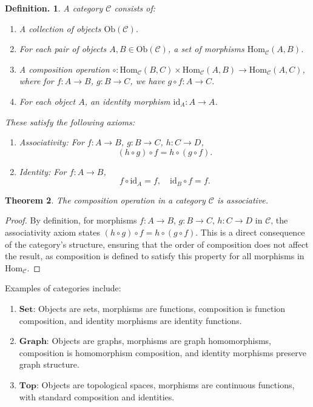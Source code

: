 \documentclass{amsart}
\newtheorem{thm}{Theorem}
\newtheorem{defn}[thm]{Definition.}
\begin{document}
\begin{defn}
A \emph{category} \( \mathcal{C} \) consists of:
\begin{enumerate}
    \item A collection of \emph{objects} \( \text{Ob}(\mathcal{C}) \).
    \item For each pair of objects \( A, B \in \text{Ob}(\mathcal{C}) \), a set of \emph{morphisms} \( \text{Hom}_{\mathcal{C}}(A, B) \).
    \item A \emph{composition} operation \( \circ: \text{Hom}_{\mathcal{C}}(B, C) \times \text{Hom}_{\mathcal{C}}(A, B) \to \text{Hom}_{\mathcal{C}}(A, C) \), where for \( f: A \to B \), \( g: B \to C \), we have \( g \circ f: A \to C \).
    \item For each object \( A \), an \emph{identity morphism} \( \text{id}_A: A \to A \).
\end{enumerate}
These satisfy the following axioms:
\begin{enumerate}
    \item \emph{Associativity}: For \( f: A \to B \), \( g: B \to C \), \( h: C \to D \), 
    \[
    (h \circ g) \circ f = h \circ (g \circ f).
    \]
    \item \emph{Identity}: For \( f: A \to B \),
    \[
    f \circ \text{id}_A = f, \quad \text{id}_B \circ f = f.
    \]
\end{enumerate}
\end{defn}

\begin{thm}
The composition operation in a category \( \mathcal{C} \) is associative.
\end{thm}

\begin{proof}
By definition, for morphisms \( f: A \to B \), \( g: B \to C \), \( h: C \to D \) in \( \mathcal{C} \), the associativity axiom states \( (h \circ g) \circ f = h \circ (g \circ f) \). This is a direct consequence of the category’s structure, ensuring that the order of composition does not affect the result, as composition is defined to satisfy this property for all morphisms in \( \text{Hom}_{\mathcal{C}} \).
\end{proof}

Examples of categories include:
\begin{enumerate}
    \item \( \mathbf{Set} \): Objects are sets, morphisms are functions, composition is function composition, and identity morphisms are identity functions.
    \item \( \mathbf{Graph} \): Objects are graphs, morphisms are graph homomorphisms, composition is homomorphism composition, and identity morphisms preserve graph structure.
    \item \( \mathbf{Top} \): Objects are topological spaces, morphisms are continuous functions, with standard composition and identities.
\end{enumerate}
\end{document}
